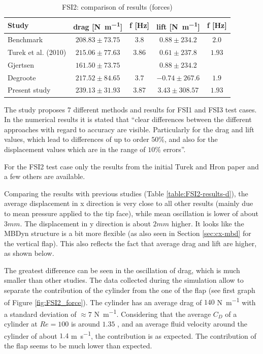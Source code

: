 \begin{table}[!htb]
	\begin{center}
		\begin{tabular}{ l | c c | c c  |  } 
			Study & drag [\si{N.m^{-1}}] & f [\si{Hz}] & lift [\si{N.m^{-1}}] & f [\si{Hz}]    \\ 
			\hline
			\hline
			Benchmark  \cite{turek2006proposal} & $208.83\pm73.75$ & $3.8$ & $0.88\pm234.2$ & $2.0$     \\
			Turek et al. (2010) \cite{turek2010numerical} & $215.06\pm77.63$ & $3.86$ & $0.61\pm237.8$ & $1.93$\\   
			Gjertsen \cite{gjertsen2017development} & $161.50\pm73.75$ & & $0.88\pm234.2$ & \\
			Degroote \cite{degroote2009interface}  & $217.52\pm84.65$ & $3.7$ & $-0.74\pm267.6$ & $1.9$ \\
			\hline
			Present study & $239.13\pm31.93$ & $3.87$ & $3.43\pm308.57$ & $1.93$ \\
		\end{tabular}
	\end{center}
	\caption{FSI2: comparison of results (forces)}
	\label{table:FSI2-results-f}
\end{table}


The study \cite{turek2010numerical} proposes 7 different methods and results for FSI1 and FSI3 test cases. In the numerical results it is stated that ``clear differences between the different approaches with regard to accuracy are visible. Particularly for the drag and lift values, which lead to differences of up to order $50\%$, and also for the displacement values which are in the range of $10\%$ errors''.

For the FSI2 test case only the results from the initial Turek and Hron paper \cite{turek2006proposal} and a few others are available.

Comparing the results with previous studies (Table \ref{table:FSI2-results-d}), the average displacement in x direction is very close to all other results (mainly due to mean pressure applied to the tip face), while mean oscillation is lower of about $3mm$. The displacement in y direction is about $2mm$ higher. It looks like the MBDyn structure is a bit more flexible (as also seen in Section \ref{sec:cx-mbd} for the vertical flap). This also reflects the fact that average drag and lift are higher, as shown below.

The greatest difference can be seen in the oscillation of drag, which is much smaller than other studies. The data collected during the simulation allow to separate the contribution of the cylinder from the one of the flap (see first graph of Figure \ref{fig:FSI2_force}). The cylinder has an average drag of $140$ \si{N.m^{-1}} with a standard deviation of $\approx7$ \si{N.m^{-1}}. Considering that the average $C_D$ of a cylinder at $Re=100$ is around $1.35$ \cite{qin2017direct}, and an average fluid velocity around the cylinder of about $1.4$ \si{m.s^{-1}}, the contribution is as expected. The contribution of the flap seems to be much lower than expected.

